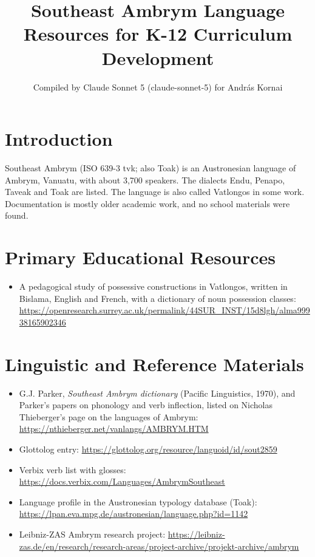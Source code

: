 \documentclass[12pt]{article}
\title{Southeast Ambrym Language Resources for K-12 Curriculum Development}
\author{Compiled by Claude Sonnet 5 (claude-sonnet-5) for Andr\'as Kornai}
\date{}
\begin{document}
\maketitle

\section{Introduction}
Southeast Ambrym (ISO 639-3 tvk; also Toak) is an Austronesian language of Ambrym, Vanuatu, with about 3,700 speakers. The dialects Endu, Penapo, Taveak and Toak are listed. The language is also called Vatlongos in some work. Documentation is mostly older academic work, and no school materials were found.

\section{Primary Educational Resources}
\begin{itemize}
\item A pedagogical study of possessive constructions in Vatlongos, written in Bislama, English and French, with a dictionary of noun possession classes: \url{https://openresearch.surrey.ac.uk/permalink/44SUR_INST/15d8lgh/alma99938165902346}
\end{itemize}

\section{Linguistic and Reference Materials}
\begin{itemize}
\item G.J. Parker, \emph{Southeast Ambrym dictionary} (Pacific Linguistics, 1970), and Parker's papers on phonology and verb inflection, listed on Nicholas Thieberger's page on the languages of Ambrym: \url{https://nthieberger.net/vanlangs/AMBRYM.HTM}
\item Glottolog entry: \url{https://glottolog.org/resource/languoid/id/sout2859}
\item Verbix verb list with glosses: \url{https://docs.verbix.com/Languages/AmbrymSoutheast}
\item Language profile in the Austronesian typology database (Toak): \url{https://lpan.eva.mpg.de/austronesian/language.php?id=1142}
\item Leibniz-ZAS Ambrym research project: \url{https://leibniz-zas.de/en/research/research-areas/project-archive/projekt-archive/ambrym}
\end{itemize}
\end{document}
